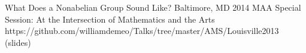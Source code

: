     \vspace{\vsp}

\talkurl
    {What Does a Nonabelian Group Sound Like?}
    {Baltimore, MD 2014}
    {MAA Special Session: At the Intersection of Mathematics and the Arts} 
    {https://github.com/williamdemeo/Talks/tree/master/AMS/Louisville2013}
    {(slides)}
    
    \vspace{\vsp}











    



